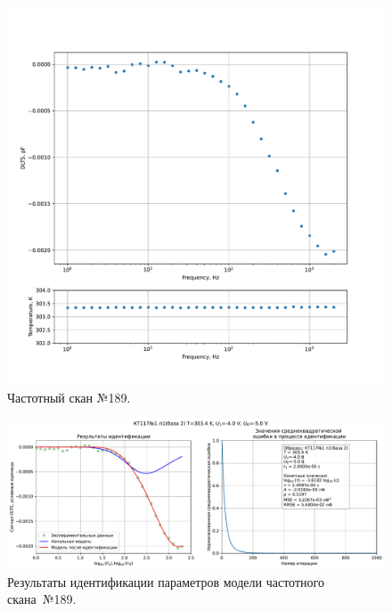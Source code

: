 \begin{figure}[!ht]
    \centering
    \includegraphics[width=1\textwidth]{../plots/КТ117№1_п1(база 2)_2500Гц-1Гц_1пФ_+30С_-4В-5В_50мВ_20мкс_шаг_0,1.pdf}
    \caption{Частотный скан №189.}
    \label{pic:frequency_scan_189}
\end{figure}

\begin{figure}[!ht]
    \centering
    \includegraphics[width=1\textwidth]{../plots/КТ117№1_п1(база 2)_2500Гц-1Гц_1пФ_+30С_-4В-5В_50мВ_20мкс_шаг_0,1_model.pdf}
    \caption{Результаты идентификации параметров модели частотного скана~№189.}
    \label{pic:frequency_scan_model189}
\end{figure}

\pagebreak


